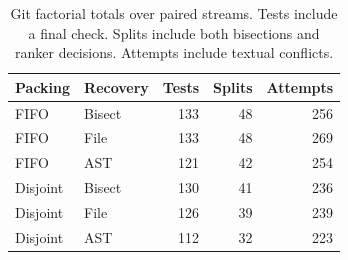\begin{table}[t]\centering\small
\caption{Git factorial totals over paired streams. Tests include a final check. Splits include both bisections and ranker decisions. Attempts include textual conflicts.}\label{tab:gitfactorial}
\begin{tabular}{llrrr}\toprule Packing & Recovery & Tests & Splits & Attempts \\ \midrule
FIFO & Bisect & 133 & 48 & 256 \\
FIFO & File & 133 & 48 & 269 \\
FIFO & AST & 121 & 42 & 254 \\
Disjoint & Bisect & 130 & 41 & 236 \\
Disjoint & File & 126 & 39 & 239 \\
Disjoint & AST & 112 & 32 & 223 \\
\bottomrule\end{tabular}\end{table}
